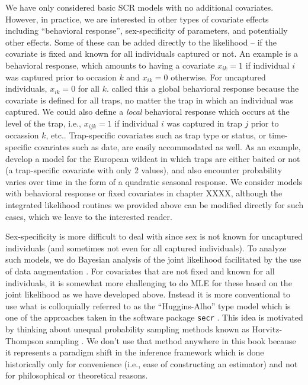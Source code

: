 We have only considered basic SCR models with no additional
covariates. However, in practice, we are interested in other types of
covariate effects including ``behavioral response'', 
sex-specificity of parameters, and potentially other effects. Some of
these  can be added directly to the likelihood – if the covariate is fixed
and known for all individuals captured or not. An example is a
behavioral response, which amounts to having a covariate $x_{ik}=1$ if
individual $i$ was captured prior to occasion $k$ and $x_{ik}=0$
otherwise. For uncaptured individuals, $x_{ik}=0$ for all $k$.
 \citet{royle_etal:2011jwm} called this a global behavioral
response because the covariate is defined for all traps, no matter the
trap in which an individual was captured. We could also define a {\it
  local} behavioral response which occurs at the level of the trap,
i.e., $x_{ijk}=1$ if individual $i$ was captured in trap $j$ prior to
occassion $k$, etc.. 
Trap-specific covariates such as trap type or status, or
time-specific covariates such as date, are easily accommodated as
well. As an example, \citet{kery_etal:2010} develop a model for the
European wildcat in which traps are either baited or not (a
trap-specific covariate with only 2 values), and also encounter
probability varies over time in the form of a quadratic seasonal response.
We consider models with behavioral response or fixed covariates in
chapter XXXX, although 
the integrated likelihood routines we provided above can be
modified directly for such cases, which we leave to the interested reader. 

Sex-specificity is more difficult to deal with since sex is not known
for uncaptured individuals (and sometimes not even for all captured
individuals).  To analyze such models, we do Bayesian analysis of the
joint likelihood facilitated by the use of data augmentation
\citep{gardner_etal:2010,russell_etal:2012}. For covariates that are
not fixed and known for all individuals, it is somewhat more
challenging to do MLE for these based on the joint likelihood as we
have developed above. Instead it is more conventional to use what is
colloquially referred to as the ``Huggins-Alho'' type model which is
one of the approaches taken in the software package \mbox{\tt secr}
\citep[][see sec. \ref{mle.sec.secr}]{efford:2011}. This idea is
motivated by thinking about unequal probability sampling methods known
as Horvitz-Thompson sampling \citep[e.g.,
see][]{overton_stehman:1995}.  We don't use that method anywhere in
this book because it represents a paradigm shift in the inference
framework which is done historically only for convenience (i.e., ease
of constructing an estimator) and not for philosophical or theoretical
reasons.






